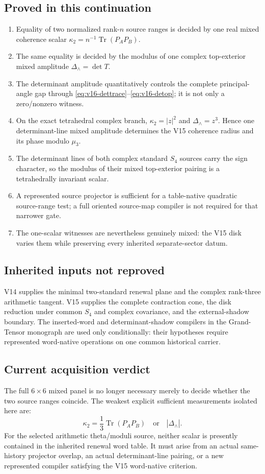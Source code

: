 \documentclass[11pt]{article}
\theoremstyle{definition}
\theoremstyle{remark}
\newcommand{\Tr}{\operatorname{Tr}}
\begin{document}
\subsection{Proved in this continuation}
\begin{enumerate}[leftmargin=2.2em]
\item Equality of two normalized rank-$n$ source ranges is decided by one real
      mixed coherence scalar $\kappa_2=n^{-1}\Tr(P_AP_B)$.
\item The same equality is decided by the modulus of one complex top-exterior
      mixed amplitude $\Delta_\wedge=\det T$.
\item The determinant amplitude quantitatively controls the complete
      principal-angle gap through \eqref{eq:v16-dettrace}--\eqref{eq:v16-detop}; it is not only
      a zero/nonzero witness.
\item On the exact tetrahedral complex branch,
      $\kappa_2=|z|^2$ and $\Delta_\wedge=z^3$.  Hence one determinant-line
      mixed amplitude determines the V15 coherence radius and its phase modulo
      $\mu_3$.
\item The determinant lines of both complex standard $S_4$ sources carry the
      sign character, so the modulus of their mixed top-exterior pairing is a
      tetrahedrally invariant scalar.
\item A represented source projector is sufficient for a table-native
      quadratic source-range test; a full oriented source-map compiler is not
      required for that narrower gate.
\item The one-scalar witnesses are nevertheless genuinely mixed: the V15 disk
      varies them while preserving every inherited separate-sector datum.
\end{enumerate}

\subsection{Inherited inputs not reproved}
V14 supplies the minimal two-standard renewal plane and the complex rank-three
arithmetic tangent.  V15 supplies the complete contraction cone, the disk
reduction under common $S_4$ and complex covariance, and the external-shadow
boundary.  The inserted-word and determinant-shadow compilers in the
Grand-Tensor monograph are used only conditionally: their hypotheses require
represented word-native operations on one common historical carrier.

\subsection{Current acquisition verdict}
The full $6\times6$ mixed panel is no longer necessary merely to decide
whether the two source ranges coincide.  The weakest explicit sufficient
measurements isolated here are:
\[
 \boxed{
 \kappa_2=\frac13\Tr(P_AP_B)
 \quad\text{or}\quad
 |\Delta_\wedge|.}
\]
For the selected arithmetic theta/moduli source, neither scalar is presently
contained in the inherited renewal word table.  It must arise from an actual
same-history projector overlap, an actual determinant-line pairing, or a new
represented compiler satisfying the V15 word-native criterion.
\end{document}
